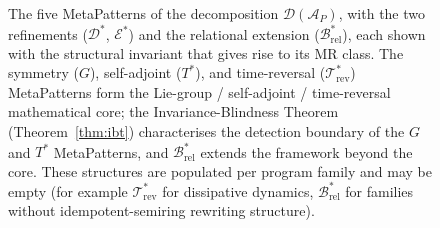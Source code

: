 \documentclass[acmsmall,screen,review]{acmart}
\begin{document}
\begin{figure}[h]
\centering
{}
\caption{The five MetaPatterns of the decomposition $\mathcal{D}(\mathcal{A}_P)$, with the two refinements ($\mathcal{D}^{*}$, $\mathcal{E}^{*}$) and the relational extension ($\mathcal{B}^{*}_{\mathrm{rel}}$),
each shown with the structural invariant that gives rise to its MR class. The
symmetry ($G$), self-adjoint ($T^{*}$), and time-reversal
($\mathcal{T}^{*}_{\mathrm{rev}}$) MetaPatterns form the Lie-group / self-adjoint /
time-reversal mathematical core; the Invariance-Blindness Theorem
(Theorem~\ref{thm:ibt}) characterises the detection boundary of the $G$ and
$T^{*}$ MetaPatterns, and $\mathcal{B}^{*}_{\mathrm{rel}}$ extends the framework beyond
the core. These structures are populated per program family and may be empty (for example
$\mathcal{T}^{*}_{\mathrm{rev}}$ for dissipative dynamics, $\mathcal{B}^{*}_{\mathrm{rel}}$
for families without idempotent-semiring rewriting structure).}
\label{fig:blocks}
\end{figure}
\end{document}
